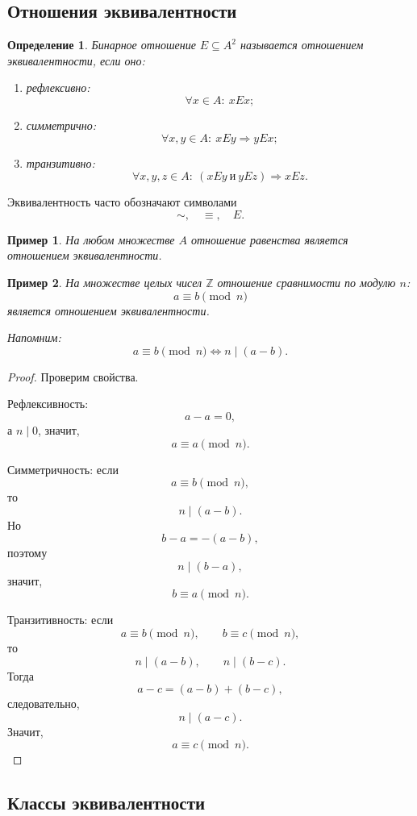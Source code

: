 \documentclass[12pt,a4paper]{article}
\newtheorem{definition}{Определение}
\newtheorem{example}{Пример}
\begin{document}
\subsection{Отношения эквивалентности}

\begin{definition}
Бинарное отношение $E\subseteq A^2$ называется \emph{отношением эквивалентности}, если оно:

\begin{enumerate}
\item рефлексивно:
\[
\forall x\in A:\ xEx;
\]
\item симметрично:
\[
\forall x,y\in A:\ xEy\Rightarrow yEx;
\]
\item транзитивно:
\[
\forall x,y,z\in A:\ (xEy\ \text{и}\ yEz)\Rightarrow xEz.
\]
\end{enumerate}
\end{definition}

Эквивалентность часто обозначают символами
\[
\sim,\quad \equiv,\quad E.
\]

\begin{example}
На любом множестве $A$ отношение равенства является отношением эквивалентности.
\end{example}

\begin{example}
На множестве целых чисел $\mathbb Z$ отношение сравнимости по модулю $n$:
\[
a\equiv b\pmod n
\]
является отношением эквивалентности.

Напомним:
\[
a\equiv b\pmod n \iff n\mid (a-b).
\]
\end{example}

\begin{proof}
Проверим свойства.

Рефлексивность:
\[
a-a=0,
\]
а $n\mid 0$, значит,
\[
a\equiv a\pmod n.
\]

Симметричность:
если
\[
a\equiv b\pmod n,
\]
то
\[
n\mid(a-b).
\]
Но
\[
b-a=-(a-b),
\]
поэтому
\[
n\mid(b-a),
\]
значит,
\[
b\equiv a\pmod n.
\]

Транзитивность:
если
\[
a\equiv b\pmod n,\qquad b\equiv c\pmod n,
\]
то
\[
n\mid(a-b),\qquad n\mid(b-c).
\]
Тогда
\[
a-c=(a-b)+(b-c),
\]
следовательно,
\[
n\mid(a-c).
\]
Значит,
\[
a\equiv c\pmod n.
\]
\end{proof}

\subsection{Классы эквивалентности}
\end{document}
